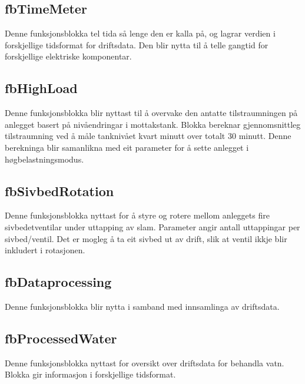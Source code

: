 \subsection{fbTimeMeter}
Denne funksjonsblokka tel tida så lenge den er kalla på, og lagrar verdien i forskjellige tidsformat for driftsdata.
Den blir nytta til å telle gangtid for forskjellige elektriske komponentar.

\newpage

\subsection{fbHighLoad}
Denne funksjonsblokka blir nyttast til å overvake den antatte tilstraumningen på anlegget basert på nivåendringar i mottakstank.
Blokka bereknar gjennomsnittleg tilstraumning ved å måle tanknivået kvart minutt over totalt 30 minutt.
Denne berekninga blir samanlikna med eit parameter for å sette anlegget i høgbelastningsmodus.

\subsection{fbSivbedRotation}
Denne funksjonsblokka nyttast for å styre og rotere mellom anleggets fire sivbedetventilar under uttapping av slam. 
Parameter angir antall uttappingar per sivbed/ventil.
Det er mogleg å ta eit sivbed ut av drift, slik at ventil ikkje blir inkludert i rotasjonen.

\subsection{fbDataprocessing}
Denne funksjonsblokka blir nytta i samband med innsamlinga av driftsdata. 

\subsection{fbProcessedWater}
Denne funksjonsblokka nyttast for oversikt over driftsdata for behandla vatn. 
Blokka gir informasjon i forskjellige tidsformat.

\newpage

